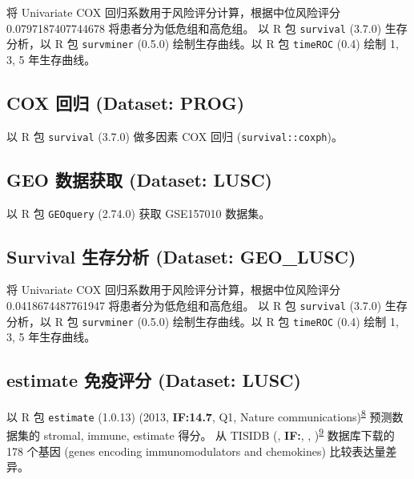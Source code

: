 \documentclass[
]{article}
\begin{document}
将 Univariate COX 回归系数用于风险评分计算，根据中位风险评分 0.0797187407744678 将患者分为低危组和高危组。
以 R 包 \texttt{survival} (3.7.0) 生存分析，以 R 包 \texttt{survminer} (0.5.0) 绘制生存曲线。以 R 包 \texttt{timeROC} (0.4) 绘制 1, 3, 5 年生存曲线。

\hypertarget{cox-ux56deux5f52-dataset-prog}{%
\subsection{COX 回归 (Dataset: PROG)}\label{cox-ux56deux5f52-dataset-prog}}

以 R 包 \texttt{survival} (3.7.0) 做多因素 COX 回归 (\texttt{survival::coxph})。

\hypertarget{geo-ux6570ux636eux83b7ux53d6-dataset-lusc}{%
\subsection{GEO 数据获取 (Dataset: LUSC)}\label{geo-ux6570ux636eux83b7ux53d6-dataset-lusc}}

以 R 包 \texttt{GEOquery} (2.74.0) 获取 GSE157010 数据集。

\hypertarget{survival-ux751fux5b58ux5206ux6790-dataset-geo_lusc}{%
\subsection{Survival 生存分析 (Dataset: GEO\_LUSC)}\label{survival-ux751fux5b58ux5206ux6790-dataset-geo_lusc}}

将 Univariate COX 回归系数用于风险评分计算，根据中位风险评分 0.0418674487761947 将患者分为低危组和高危组。
以 R 包 \texttt{survival} (3.7.0) 生存分析，以 R 包 \texttt{survminer} (0.5.0) 绘制生存曲线。以 R 包 \texttt{timeROC} (0.4) 绘制 1, 3, 5 年生存曲线。

\hypertarget{estimate-ux514dux75abux8bc4ux5206-dataset-lusc}{%
\subsection{estimate 免疫评分 (Dataset: LUSC)}\label{estimate-ux514dux75abux8bc4ux5206-dataset-lusc}}

以 R 包 \texttt{estimate} (1.0.13) (2013, \textbf{IF:14.7}, Q1, Nature communications)\textsuperscript{\protect\hyperlink{ref-Inferring_tumou_Yoshih_2013}{8}} 预测数据集的 stromal, immune, estimate 得分。
从 TISIDB (, \textbf{IF:}, , )\textsuperscript{\protect\hyperlink{ref-TISIDB_an_inte_Ru_Be_2019}{9}} 数据库下载的 178 个基因 (genes encoding immunomodulators and chemokines) 比较表达量差异。
\end{document}
